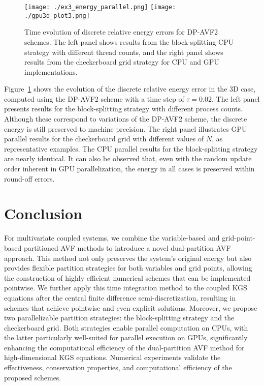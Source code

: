 \documentclass[fleqn,11pt]{elsarticle}
\numberwithin{equation}{section}
\begin{document}
\begin{figure}[H]
	\centering
		\texttt{[image: ./ex3\_energy\_parallel.png]}
		\texttt{[image: ./gpu3d\_plot3.png]}
	\caption{Time evolution of discrete relative energy errors for DP-AVF2 schemes. The left panel shows results from the block-splitting CPU strategy with different thread counts, and the right panel shows results from the checkerboard grid strategy for CPU and GPU implementations. }\label{cpu_energy3d}
\end{figure}


Figure~\ref{cpu_energy3d} shows the evolution of the discrete relative energy error in the 3D case, computed using the DP-AVF2 scheme with a time step of $\tau = 0.02$.  The left panel presents results for the block-splitting strategy with different process counts. Although these correspond to variations of the DP-AVF2 scheme, the discrete energy is still preserved to machine precision. The right panel illustrates GPU parallel results for the checkerboard grid with different values of $N$, as representative examples. The CPU parallel results for the block-splitting strategy are nearly identical. It can also be observed that, even with the random update order inherent in GPU parallelization, the energy in all cases is preserved within round-off errors.



\section{Conclusion}\label{sec:6}

For multivariate coupled systems, we combine the variable-based and grid-point-based partitioned AVF methods to introduce a novel dual-partition AVF approach. This method not only preserves the system's original energy but also provides flexible partition strategies for both variables and grid points, allowing the construction of highly efficient numerical schemes that can be implemented pointwise. We further apply this time integration method to the coupled KGS equations after the central finite difference semi-discretization, resulting in schemes that achieve pointwise and even explicit solutions. Moreover, we propose two parallelizable partition strategies: the block-splitting strategy and the checkerboard grid. Both strategies enable parallel computation on CPUs, with the latter particularly well-suited for parallel execution on GPUs, significantly enhancing the computational efficiency of the dual-partition AVF method for high-dimensional KGS equations. Numerical experiments validate the effectiveness, conservation properties, and computational efficiency of the proposed schemes.
\end{document}
